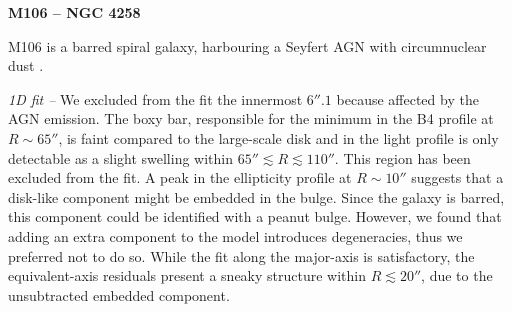 \documentclass[preprint2]{emulateapj}
\begin{document}
  \clearpage\newpage\noindent
  {\bf M106 -- NGC 4258 \\} 

  M106 is a barred spiral galaxy, harbouring a Seyfert AGN \citep{veroncettyveron2006} 
  with %
  circumnuclear dust \citep{martini2003}. 


  \emph{1D fit -- }
  We excluded from the fit the innermost $6''.1$ because affected by the AGN emission.
  The boxy bar, responsible for the minimum in the B4 profile at $R \sim 65''$, 
  is faint compared to the large-scale disk and in the light profile is only detectable as a slight swelling
  within $65'' \lesssim R \lesssim 110''$.
  This region has been excluded from the fit.
  A peak in the ellipticity profile at $R \sim 10''$ suggests that a disk-like component might be 
  embedded in the bulge.
  Since the galaxy is barred, this component could be identified with a peanut bulge. 
  However, we found that adding an extra component to the model introduces degeneracies, 
  thus we preferred not to do so.
  While the fit along the major-axis is satisfactory, 
  the equivalent-axis residuals present a sneaky structure within $R \lesssim 20''$,
  due to the unsubtracted embedded component.
\end{document}
